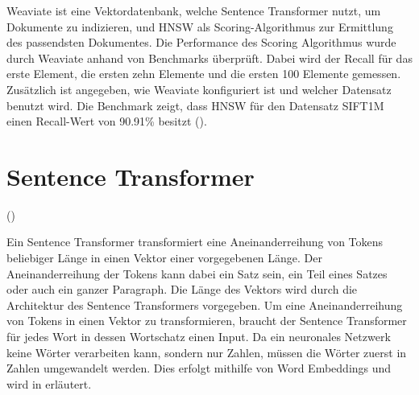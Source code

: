 
Weaviate ist eine Vektordatenbank, welche Sentence Transformer nutzt, um Dokumente zu indizieren, und HNSW als Scoring-Algorithmus zur Ermittlung des passendsten Dokumentes.
Die Performance des Scoring Algorithmus wurde durch Weaviate anhand von Benchmarks überprüft.
Dabei wird der Recall für das erste Element, die ersten zehn Elemente und die ersten 100 Elemente gemessen.
Zusätzlich ist angegeben, wie Weaviate konfiguriert ist und welcher Datensatz benutzt wird.
Die Benchmark zeigt, dass HNSW für den Datensatz SIFT1M einen Recall-Wert von 90.91\% besitzt (\cite{Weaviate_Benchmark}).

\section{Sentence Transformer}
\label{chap:sentence-transformer}
(\cite{Reimers_Gurevych_2019})

Ein Sentence Transformer transformiert eine Aneinanderreihung von Tokens beliebiger Länge in einen Vektor einer vorgegebenen Länge.
Der Aneinanderreihung der Tokens kann dabei ein Satz sein, ein Teil eines Satzes oder auch ein ganzer Paragraph.
Die Länge des Vektors wird durch die Architektur des Sentence Transformers vorgegeben.
Um eine Aneinanderreihung von Tokens in einen Vektor zu transformieren, braucht der Sentence Transformer für jedes Wort in dessen Wortschatz einen Input.
Da ein neuronales Netzwerk keine Wörter verarbeiten kann, sondern nur Zahlen, müssen die Wörter zuerst in Zahlen umgewandelt werden.
Dies erfolgt mithilfe von Word Embeddings und wird in  erläutert.\\


